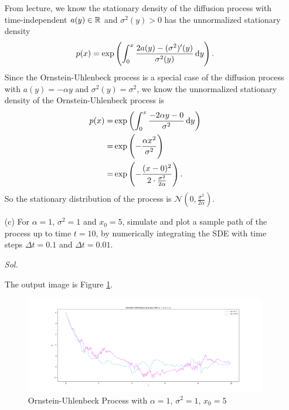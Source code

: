 \begin{enumerate}
    From lecture, we know the stationary density of the diffusion process with time-independent $a(y) \in \mathbb{R}$ and $\sigma^2(y) > 0$ has the unnormalized stationary density
    $$
    p(x) = \exp\left(\int_0^x \frac{2a(y) - (\sigma^2)'(y)}{\sigma^2(y)} \dif y \right).
    $$
    Since the Ornstein-Uhlenbeck process is a special case of the diffusion process with $a(y) = -\alpha y$ and $\sigma^2(y) = \sigma^2$, we know the unnormalized stationary density of the Ornstein-Uhlenbeck process is 
    \begin{align*}
        p(x) = & \exp\left(\int_0^x \frac{- 2 \alpha y - 0}{\sigma^2} \dif y \right) \\ 
        = & \exp \left(- \frac{\alpha x^2}{\sigma^2} \right) \\ 
        = & \exp \left( - \frac{ (x - 0)^2}{2 \cdot \frac{\sigma^2}{2\alpha} } \right).
    \end{align*}
    So the stationary distribution of the process is $\mathcal{N}(0, \frac{\sigma^2}{2\alpha})$.

    \item[(c)] For $\alpha = 1$, $\sigma^2 = 1$ and $x_0 = 5$, simulate and plot a sample path of the process up to time $t = 10$, by numerically integrating the SDE with time steps $\Delta t = 0.1$ and $\Delta t = 0.01$.
    
    \textit{ Sol. }
    
    The output image is Figure \ref{fig2}.
    \begin{figure}[h!]
        \includegraphics[width=18cm]{Ornstein_Uhlenbeck.png}
        \caption{Ornstein-Uhlenbeck Process with $\alpha = 1$, $\sigma^2 = 1$, $x_0 = 5$}
        \label{fig2}
    \end{figure}
\end{enumerate}
